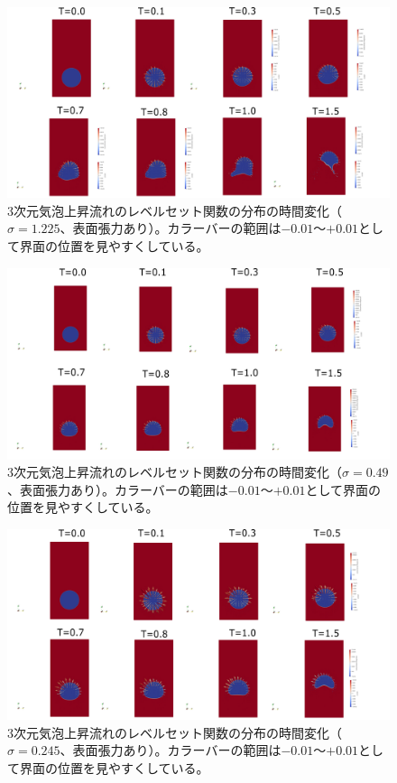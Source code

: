 \documentclass[8pt,a4paper]{article}
\begin{document}
\begin{figure}[H]
	\centering
	\includegraphics[width=18truecm]{pics/3d-bubble/result_sigma24_5.pdf}
	\caption{3次元気泡上昇流れのレベルセット関数の分布の時間変化（$\sigma=1.225$、表面張力あり）。カラーバーの範囲は$-0.01$～$+0.01$として界面の位置を見やすくしている。}
	\label{fig:3d-bubble_result_sigma24.5}
\end{figure}

\begin{figure}[H]
	\centering
	\includegraphics[width=18truecm]{pics/3d-bubble/result_sigma9_8.pdf}
	\caption{3次元気泡上昇流れのレベルセット関数の分布の時間変化（$\sigma=0.49$、表面張力あり）。カラーバーの範囲は$-0.01$～$+0.01$として界面の位置を見やすくしている。}
	\label{fig:3d-bubble_result_sigma9.8}
\end{figure}

\begin{figure}[H]
	\centering
	\includegraphics[width=18truecm]{pics/3d-bubble/result_sigma4_9.pdf}
	\caption{3次元気泡上昇流れのレベルセット関数の分布の時間変化（$\sigma=0.245$、表面張力あり）。カラーバーの範囲は$-0.01$～$+0.01$として界面の位置を見やすくしている。}
	\label{fig:3d-bubble_result_sigma4.9}
\end{figure}
\end{document}
